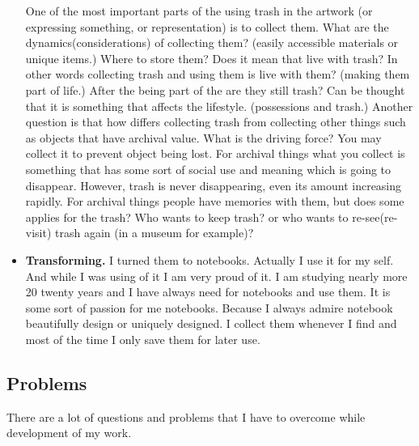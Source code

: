 \begin{itemize}
 One of the most important parts of the using trash in the artwork (or expressing something, or representation) is to collect them. What are the dynamics(considerations) of collecting them? (easily accessible materials or unique items.) Where to store them? Does it mean that live with trash? In other words collecting trash and using them is live with them? (making them part of life.) After the being part of the are they still trash? Can be thought that it is something that affects the lifestyle. (possessions and trash.) Another question is that how differs collecting trash from collecting other things such as objects that have archival value. What is the driving force? You may collect it to prevent object being lost. For archival things what you collect is something that has some sort of social use and meaning which is going to disappear. However, trash is never disappearing, even its amount increasing rapidly. For archival things people have memories with them, but does some applies for the trash? Who wants to keep trash? or who wants to re-see(re-visit) trash again (in a museum for example)?


\item \textbf{Transforming.} I turned them to notebooks. Actually I use it for my self. And while I was using of it I am very proud of it. I am studying nearly more 20 twenty years and I have always need for notebooks and use them. It is some sort of passion for me notebooks. Because I always admire notebook beautifully design or uniquely designed. I collect them whenever I find and most of the time I only save them for later use. 
\end{itemize}

\subsection{Problems}
There are a lot of questions and problems that I have to overcome while development of my work. 


